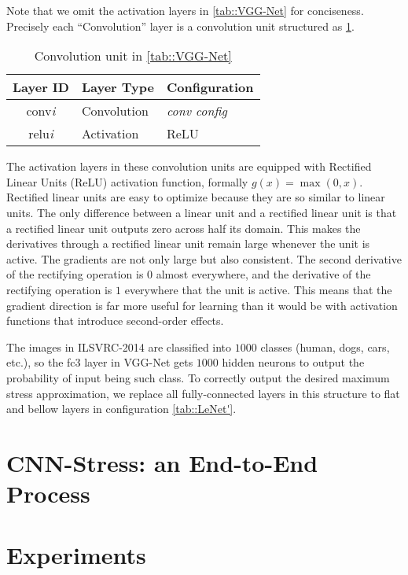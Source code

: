 Note that we omit the activation layers in \ref{tab::VGG-Net} for conciseness. 
Precisely each ``Convolution'' layer is a convolution unit structured as \ref{tab::VGG-CU}.
\begin{table}[htb]
    \centering
    \begin{tabular}{cll}
        \toprule
        Layer ID & Layer Type & Configuration \\
        \midrule
        conv\textit{i} & Convolution & \textit{conv config} \\
        relu\textit{i} & Activation  & ReLU \\
        \bottomrule
    \end{tabular}
    \caption{Convolution unit in \ref{tab::VGG-Net}}
    \label{tab::VGG-CU}
\end{table}
The activation layers in these convolution units are equipped with Rectified Linear Units (ReLU)
activation function, formally $g(x) = \max (0, x)$. 
Rectified linear units are easy to optimize because they are so similar to linear units. 
The only difference between a linear unit and a rectified linear unit is that a rectified linear unit outputs zero across half its domain. 
This makes the derivatives through a rectified linear unit remain large whenever the unit is active.
The gradients are not only large but also consistent. The second derivative of the rectifying operation is $0$ almost everywhere, 
and the derivative of the rectifying operation is $1$ everywhere that the unit is active. 
This means that the gradient direction is far more useful for learning than it would be with activation functions
that introduce second-order effects.
    
The images in ILSVRC-2014 are classified into $1000$ classes (human, dogs, cars, etc.),
so the fc3 layer in VGG-Net gets $1000$ hidden neurons to output the probability of input being
such class.
To correctly output the desired maximum stress approximation,
we replace all fully-connected layers in this structure to flat and bellow layers in configuration
\ref{tab::LeNet'}.

\section{CNN-Stress: an End-to-End Process}

\section{Experiments} \label{sec::exper}
